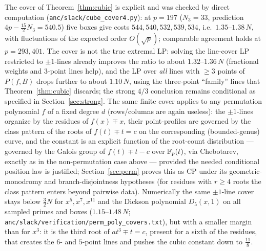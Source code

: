 \begin{remark}
The cover of Theorem~\ref{thm:cubic} is explicit and was checked by direct computation
(\texttt{anc/slack/cube\_cover4.py}): at $p=197$ ($N_3=33$, prediction $4p-\tfrac{15}2N_3=540.5$) five boxes give costs
$544,540,532,539,534$, i.e.\ $1.35$--$1.38\,N$, with fluctuations of the expected order $O(\sqrt p)$; comparable
agreement holds at $p=293,401$. The cover is not the true extremal LP: solving the line-cover LP restricted to
$\pm1$-lines already improves the ratio to about $1.32$--$1.36\,N$ (fractional weights and $3$-point lines help),
and the LP over \emph{all} lines with $\ge3$ points of $P(f,B)$ drops further to about $1.10\,N$, using the
three-point ``family'' lines that Theorem~\ref{thm:cubic} discards; the strong $4/3$ conclusion remains conditional as specified in Section~\ref{sec:strong}. The same finite cover applies to any permutation polynomial $f$ of a fixed degree $d$ (rows/columns are
again useless): the $\pm1$-lines organize by the residues of $f(x)\mp x$, their point-profiles are governed by the
class pattern of the roots of $f(t)\mp t=c$ on the corresponding (bounded-genus) curve, and the constant is an
explicit function of the root-count distribution — governed by the Galois group of $f(t)\mp t-c$ over $\mathbb{F}_p(t)$, via
Chebotarev, exactly as in the non-permutation case above — provided the needed conditional position law is justified; Section~\ref{sec:perm} proves this as CP under its geometric-monodromy and branch-disjointness hypotheses (for residues with $r\ge4$ roots the class pattern enters beyond
pairwise data). Numerically the same $\pm1$-line cover stays below $\tfrac32N$ for $x^5,x^7,x^{11}$ and the Dickson
polynomial $D_5(x,1)$ on all sampled primes and boxes ($1.15$--$1.48\,N$; \texttt{anc/slack/verification/perm\_poly\_covers.txt}),
but with a smaller margin than for $x^3$: it is the third root of $at^3\mp t=c$, present for a sixth of the residues, that
creates the $6$- and $5$-point lines and pushes the cubic constant down to $\tfrac{11}8$.
\end{remark}
